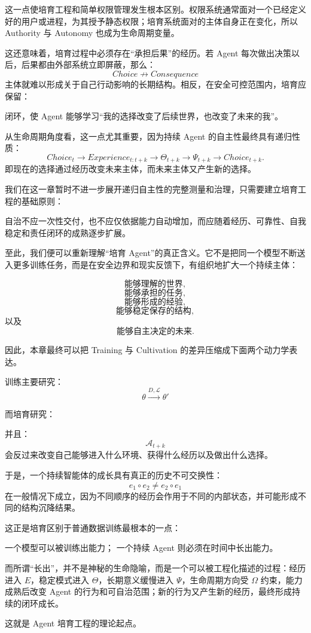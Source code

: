 这一点使培育工程和简单权限管理发生根本区别。权限系统通常面对一个已经定义好的用户或进程，为其授予静态权限；培育系统面对的主体自身正在变化，所以 Authority 与 Autonomy 也成为生命周期变量。

这还意味着，培育过程中必须存在“承担后果”的经历。若 Agent 每次做出决策以后，后果都由外部系统立即屏蔽，那么：
\[
Choice
\not\rightarrow
Consequence
\]
主体就难以形成关于自己行动影响的长期结构。相反，在安全可控范围内，培育应保留：
\begin{statementbox}
\centering
{}
\end{statementbox}
闭环，使 Agent 能够学习“我的选择改变了后续世界，也改变了未来的我”。

从生命周期角度看，这一点尤其重要，因为持续 Agent 的自主性最终具有递归性质：
\[
Choice_t
\rightarrow
Experience_{t:t+k}
\rightarrow
\Theta_{t+k}
\rightarrow
\Psi_{t+k}
\rightarrow
Choice_{t+k}.
\]
即现在的选择通过经历改变未来主体，而未来主体又产生新的选择。

我们在这一章暂时不进一步展开递归自主性的完整测量和治理，只需要建立培育工程的基础原则：

\begin{proposition*}
自治不应一次性交付，也不应仅依据能力自动增加，而应随着经历、可靠性、自我稳定和责任闭环的成熟逐步扩展。
\end{proposition*}

至此，我们便可以重新理解“培育 Agent”的真正含义。它不是把同一个模型不断送入更多训练任务，而是在安全边界和现实反馈下，有组织地扩大一个持续主体：

\[
\text{能够理解的世界},
\]
\[
\text{能够承担的任务},
\]
\[
\text{能够形成的经验},
\]
\[
\text{能够稳定保存的结构},
\]
以及
\[
\text{能够自主决定的未来}.
\]

因此，本章最终可以把 Training 与 Cultivation 的差异压缩成下面两个动力学表达。

训练主要研究：
\[
\boxed{
\theta
\xrightarrow{D,\mathcal L}
\theta'
}
\]

而培育研究：
\begin{statementbox}
\centering
{}
\end{statementbox}
并且：
\[
\mathcal A_{t+k}
\]
会反过来改变自己能够进入什么环境、获得什么经历以及做出什么选择。

于是，一个持续智能体的成长具有真正的历史不可交换性：
\[
\boxed{
e_1\circ e_2
\neq
e_2\circ e_1
}
\]
在一般情况下成立，因为不同顺序的经历会作用于不同的内部状态，并可能形成不同的结构沉降结果。

这正是培育区别于普通数据训练最根本的一点：

\begin{statementbox}
一个模型可以被训练出能力；
一个持续 Agent 则必须在时间中长出能力。
\end{statementbox}

而所谓“长出”，并不是神秘的生命隐喻，而是一个可以被工程化描述的过程：经历进入 $E$，稳定模式进入 $\Theta$，长期意义缓慢进入 $\Psi$，生命周期方向受 $\Omega$ 约束，能力成熟后改变 Agent 的行为和可自治范围；新的行为又产生新的经历，最终形成持续的闭环成长。

这就是 Agent 培育工程的理论起点。

